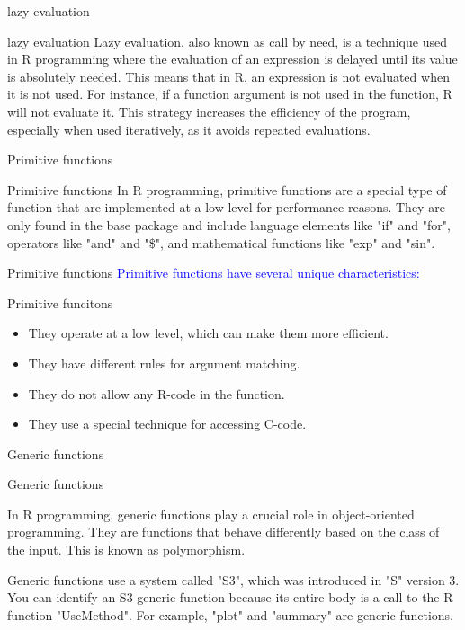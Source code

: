 \documentclass{beamer}\usepackage[]{graphicx}\usepackage[]{xcolor}
\begin{document}
\begin{frame}{lazy evaluation}
    \begin{block}{lazy evaluation}
        Lazy evaluation, also known as call by need, is a technique used in R programming where the evaluation of an expression is delayed until its value is absolutely needed. This means that in R, an expression is not evaluated when it is not used. 
        For instance, if a function argument is not used in the function, R will not evaluate it. This strategy increases the efficiency of the program, especially when used iteratively, as it avoids repeated evaluations. 
    \end{block}
\end{frame}



\begin{frame}{Primitive functions}

\begin{block}{Primitive functions}
    In R programming, primitive functions are a special type of function that are implemented at a low level for performance reasons. They are only found in the base package and include language elements like "if" and "for", operators like "and" and "\$", and mathematical functions like "exp" and "sin".
\end{block}
\end{frame}

\begin{frame}{Primitive functions}
\textcolor{blue}{Primitive functions have several unique characteristics:}

    \begin{alertblock}{Primitive funcitons}
\begin{itemize}
    \item They operate at a low level, which can make them more efficient.
    \item They have different rules for argument matching.
    \item They do not allow any R-code in the function.
    \item They use a special technique for accessing C-code.
\end{itemize}
\end{alertblock}
\end{frame}

\begin{frame}{Generic functions}
\begin{block}{Generic functions}

    In R programming, generic functions play a crucial role in object-oriented programming. They are functions that behave differently based on the class of the input. This is known as polymorphism.

Generic functions use a system called "S3", which was introduced in "S" version 3. You can identify an S3 generic function because its entire body is a call to the R function "UseMethod". For example, "plot" and "summary" are generic functions.
\end{block}
\end{frame}
\end{document}
